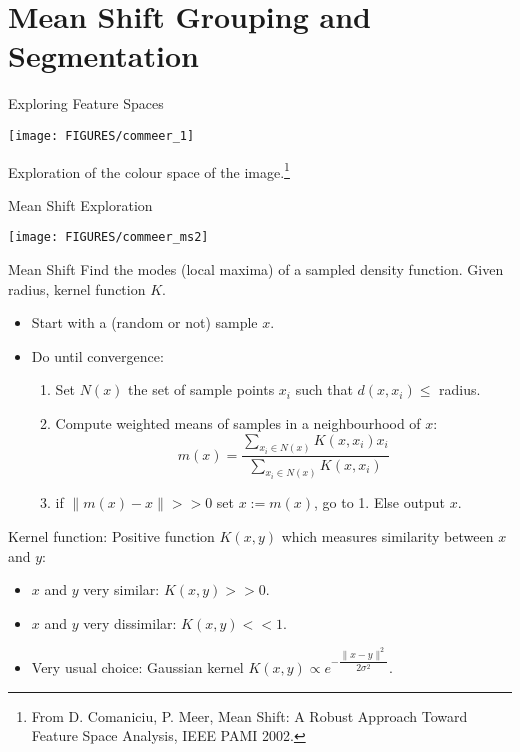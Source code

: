 \documentclass[9pt]{beamer}
\begin{document}
\section{Mean Shift Grouping and Segmentation}
\label{sec:meanshift}

\begin{frame}{Exploring Feature Spaces}
  \begin{center}
  \texttt{[image: FIGURES/commeer\_1]}  
  \end{center}
  Exploration of the colour space of the image.\footnote{From
    D. Comaniciu, P. Meer, Mean Shift: A Robust Approach Toward
    Feature Space Analysis, IEEE PAMI 2002.}
\end{frame}

\begin{frame}{Mean Shift Exploration}
  \begin{center}
    \texttt{[image: FIGURES/commeer\_ms2]}
  \end{center}
\end{frame}

\begin{frame}{Mean Shift}
  Find the modes (local maxima) of a sampled density function.
  Given radius, kernel function $K$.
  \begin{itemize}
  \item Start with a (random or not) sample $x$.
  \item Do until convergence:
    \begin{enumerate}
    \item Set $N(x)$ the set of sample points $x_i$ such that $d(x,x_i) \leq$ radius.
    \item Compute weighted means of samples in a neighbourhood of $x$:
      $$
      m(x) = \frac{\sum_{x_i\in N(x)} K(x,x_i)x_i}{\sum_{x_i\in N(x)} K(x,x_i)}
      $$
    \item if $\|m(x) - x\| >> 0$ set $x := m(x)$, go to 1. Else output $x$. 
    \end{enumerate}
  \end{itemize}\vfill
  \pause
  Kernel function: Positive function $K(x,y)$ which measures similarity between $x$ and $y$: 
  \begin{itemize}
  \item $x$ and $y$ very similar: $K(x,y) >> 0$.  
  \item$ x$ and $y$ very dissimilar: $K(x,y) << 1$.
  \item Very usual choice: Gaussian kernel $ K(x,y) \propto e^{-\dfrac{\|x-y\|^2}{2\sigma^2}}$.
  \end{itemize}
\end{frame}
\end{document}
